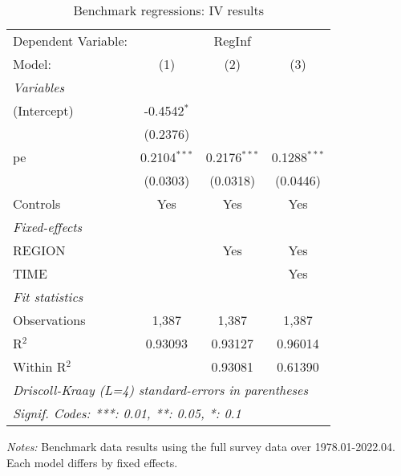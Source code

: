 
\begin{table}[htbp]
   \caption{Benchmark regressions: IV results}
   \centering
   \begin{tabular}{lccc}
      \tabularnewline \midrule \midrule
      Dependent Variable: & \multicolumn{3}{c}{RegInf}\\
      Model:       & (1)            & (2)            & (3)\\  
      \midrule
      \emph{Variables}\\
      (Intercept)  & -0.4542$^{*}$  &                &   \\   
                   & (0.2376)       &                &   \\   
      pe           & 0.2104$^{***}$ & 0.2176$^{***}$ & 0.1288$^{***}$\\   
                   & (0.0303)       & (0.0318)       & (0.0446)\\   
      Controls     & Yes            & Yes            & Yes\\  
      \midrule
      \emph{Fixed-effects}\\
      REGION       &                & Yes            & Yes\\  
      TIME         &                &                & Yes\\  
      \midrule
      \emph{Fit statistics}\\
      Observations & 1,387          & 1,387          & 1,387\\  
      R$^2$        & 0.93093        & 0.93127        & 0.96014\\  
      Within R$^2$ &                & 0.93081        & 0.61390\\  
      \midrule \midrule
      \multicolumn{4}{l}{\emph{Driscoll-Kraay (L=4) standard-errors in parentheses}}\\
      \multicolumn{4}{l}{\emph{Signif. Codes: ***: 0.01, **: 0.05, *: 0.1}}\\
   \end{tabular}
   
   \par \raggedright 
   \textit{Notes:} Benchmark data results using the full survey data over 1978.01-2022.04.  Each model differs by fixed effects.
\end{table}



